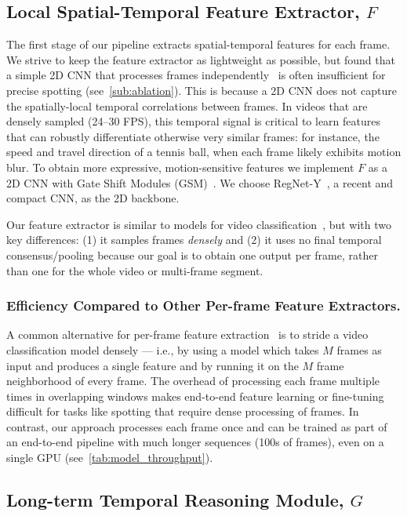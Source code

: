 \documentclass[runningheads]{llncs}
\newcommand{\notation}[1]{\ensuremath{#1}\xspace}
\newcommand{\FeatureExtractor}{\notation{F}}
\newcommand{\TemporalArchitecture}{\notation{G}}
\begin{document}
\subsection{Local Spatial-Temporal Feature Extractor, $\FeatureExtractor$}
\label{sub:st_features}
The first stage of our pipeline extracts spatial-temporal features for each frame.
We strive to keep the feature extractor as lightweight as possible, but found
that a simple 2D CNN that processes frames
independently~\cite{calf,netvladpp,rmsnet,tsn} is often insufficient for precise
spotting (see~\autoref{sub:ablation}).
This is because a 2D CNN does not capture the spatially-local temporal correlations between frames.
In videos that are densely sampled (24--30 FPS), this temporal signal is
critical to learn features that can robustly differentiate otherwise very
similar frames:
for instance, the speed and travel direction of a tennis ball, when each frame
likely exhibits motion blur.
To obtain more expressive, motion-sensitive features we implement
$\FeatureExtractor$ as a 2D CNN with Gate Shift Modules (GSM)~\cite{gsm}.
We choose RegNet-Y~\cite{regnet}, a recent and compact CNN, as the 2D backbone.

Our feature extractor is similar to models for
video classification~\cite{tsm,gsm,tsn}, but with two key differences:
(1) it samples frames \emph{densely} and
(2) it uses no final temporal consensus/pooling because our goal is to obtain one output per frame, rather than one for the whole video or multi-frame segment.

\subsubsection*{Efficiency Compared to Other Per-frame Feature Extractors.}
A common alternative for per-frame feature extraction~\cite{tsp,mstcn} is to stride a video classification model densely --- i.e., by using a model which takes $M$ frames as input and produces a single feature and by running it on the $M$ frame neighborhood of every frame.
The overhead of processing each frame multiple
times in overlapping windows makes end-to-end feature learning or fine-tuning difficult for tasks like spotting that require dense processing of frames.
In contrast, our approach processes each frame once and can be trained as part of an end-to-end pipeline with much longer sequences (100s of frames), even on a single GPU (see~\autoref{tab:model_throughput}).

\subsection{Long-term Temporal Reasoning Module, $\TemporalArchitecture$}\label{sub:longterm_reasoning}
\end{document}
